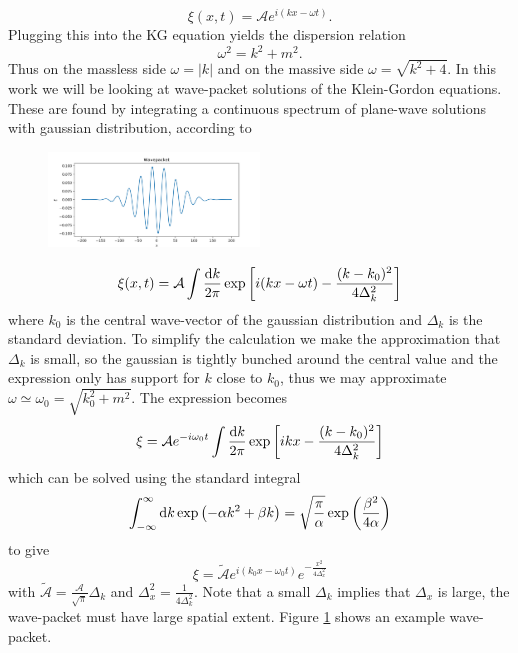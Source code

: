 \documentclass[11pt, oneside,titlepage]{article}  	%
\numberwithin{equation}{section}
\newcommand{\drv}{\ensuremath{\textup{d}}}
\begin{document}
\begin{equation}
\xi(x,t) = \mathcal{A}e^{i(kx-\omega t)}.
\end{equation}
Plugging this into the KG equation yields the dispersion relation
\begin{equation}
\omega^2 = k^2 + m^2.
\end{equation}
Thus on the massless side $\omega = |k|$ and on the massive side $\omega = \sqrt{k^2 + 4}$. In this work we will be looking at wave-packet solutions of the Klein-Gordon equations. These are found by integrating a continuous spectrum of plane-wave solutions with gaussian distribution, according to 
\begin{figure}
\centering
\includegraphics[width=0.5\textwidth]{wavepacket.png}
 \label{wavepacket}
\end{figure}
\begin{equation}
\xi (x,t) =\mathcal{A} \int \frac{\drv k}{2\pi} \exp\left[{i(kx-\omega t)} - \frac{(k-k_0)^2}{4\Delta_k^2} \right]
\end{equation}
where $k_0$ is the central wave-vector of the gaussian distribution and $\Delta_k$ is the standard deviation. To simplify the calculation we make the approximation that $\Delta_k$ is small, so the gaussian is tightly bunched around the central value and the expression only has support for $k$ close to $k_0$, thus we may approximate $\omega \simeq \omega_0 = \sqrt{k_0^2 +m^2}$. The expression becomes
\begin{equation} \label{wave_eqn}
\xi =\mathcal{A}e^{-i\omega_0 t} \int \frac{\drv k}{2\pi} \exp\left[{ikx} - \frac{(k-k_0)^2}{4\Delta_k^2} \right]
\end{equation}
which can be solved using the standard integral
\begin{equation}
\int_{-\infty}^{\infty} \drv k\exp \left ( -\alpha k^2 + \beta k \right ) = \sqrt{\frac{\pi}{\alpha}}\exp\left( \frac{\beta^2}{4\alpha}\right ) 
\end{equation}
to give
\begin{equation}
\xi =\tilde{\mathcal{A}}e^{i(k_0 x-\omega_0 t)} e^{-\frac{x^2}{4\Delta_x^2}}
\end{equation}
with $\tilde{\mathcal{A}} = \frac{\mathcal{A}}{\sqrt{\pi}}\Delta_k $ and $\Delta_x^2 = \frac{1}{4\Delta_k^2}$. Note that a small $\Delta_k$ implies that $\Delta_x$ is large, the wave-packet must have large spatial extent. Figure \ref{wavepacket} shows an example wave-packet.
\end{document}
